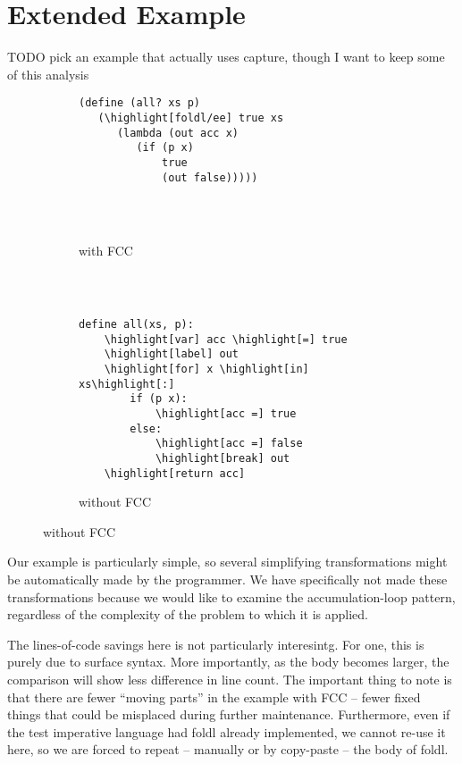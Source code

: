 \documentclass[11pt]{article}
\newcommand{\highlight}[1]{\colorbox{black!30!white}{#1}}
\begin{document}
\section{Extended Example}
\label{sec:foldl/ee}

TODO pick an example that actually uses capture, though I want to keep some of this analysis

\begin{figure}
\caption{Accumulation-loop pattern codified}
\label{fig:foldl/ee}


\begin{subfigure}[b]{0.5\textwidth}
\begin{Verbatim}[commandchars=\\\[\]]
(define (all? xs p)
   (\highlight[foldl/ee] true xs
      (lambda (out acc x)
         (if (p x)
             true
             (out false)))))




\end{Verbatim}
\caption{with FCC}
\end{subfigure}
~
\begin{subfigure}[b]{0.5\textwidth}
\begin{Verbatim}[commandchars=\\\[\]]

define all(xs, p):
    \highlight[var] acc \highlight[=] true
    \highlight[label] out
    \highlight[for] x \highlight[in] xs\highlight[:]
        if (p x):
            \highlight[acc =] true
        else:
            \highlight[acc =] false
            \highlight[break] out
    \highlight[return acc]
\end{Verbatim}
\caption{without FCC}
\end{subfigure}


\end{figure}

Our example is particularly simple, so several simplifying transformations might be automatically made by the programmer.
We have specifically not made these transformations because we would like to examine the accumulation-loop pattern, regardless of the complexity of the problem to which it is applied.

The lines-of-code savings here is not particularly interesintg.
For one, this is purely due to surface syntax.
More importantly, as the body becomes larger, the comparison will show less difference in line count.
The important thing to note is that there are fewer ``moving parts'' in the example with FCC -- fewer fixed things that could be misplaced during further maintenance.
Furthermore, even if the test imperative language had foldl already implemented, we cannot re-use it here, so we are forced to repeat -- manually or by copy-paste -- the body of foldl.
\end{document}
